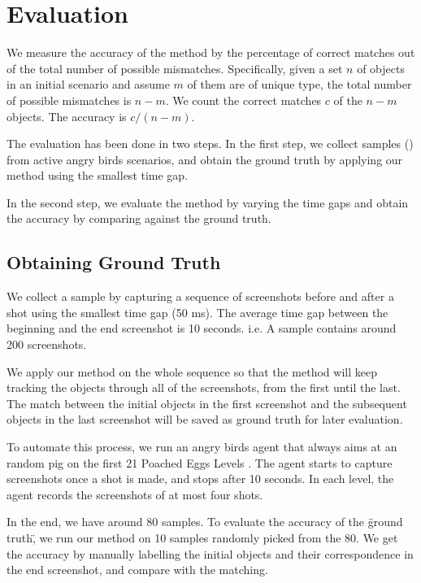 \documentclass[letterpaper]{article}
\begin{document}
\section{Evaluation}

We measure the accuracy of the method by the percentage of correct matches out of the total number of possible mismatches. Specifically, given a set $n$ of objects in an initial scenario and assume $m$ of them are of unique type, the total number of possible mismatches is $n - m$. We count the correct matches $c$ of the $n - m$ objects. The accuracy is  $c / (n - m)$.

The evaluation has been done in two steps. In the first step, we collect samples () from active angry birds scenarios, and obtain the ground truth by applying our method using the smallest time gap.

In the second step, we evaluate the method by varying the time gaps and obtain the accuracy by comparing against the ground truth.

 
\subsection{Obtaining Ground Truth}

 We collect a sample by capturing a sequence of screenshots before and after a shot using the smallest time gap (50 ms). The average time gap between the beginning and the end screenshot is 10 seconds. i.e. A sample contains around 200 screenshots.  

 We apply our method on the whole sequence so that the method will keep tracking the objects through all of the screenshots, from the first until the last. The match between the initial objects in the first screenshot and the subsequent objects in the last screenshot will be saved as ground truth for later evaluation.

To automate this process, we run an angry birds agent that always aims at an random pig on the first 21 Poached Eggs Levels \cite{}. The agent starts to capture screenshots once a shot is made, and stops after 10 seconds. In each level, the agent records the screenshots of at most four shots.

In the end, we have around 80 samples. To evaluate the accuracy of the \"ground truth\", we run our method on 10 samples randomly picked from the 80. We get the accuracy by manually labelling the initial objects and their correspondence in the end screenshot, and compare with the matching. 
\end{document}

